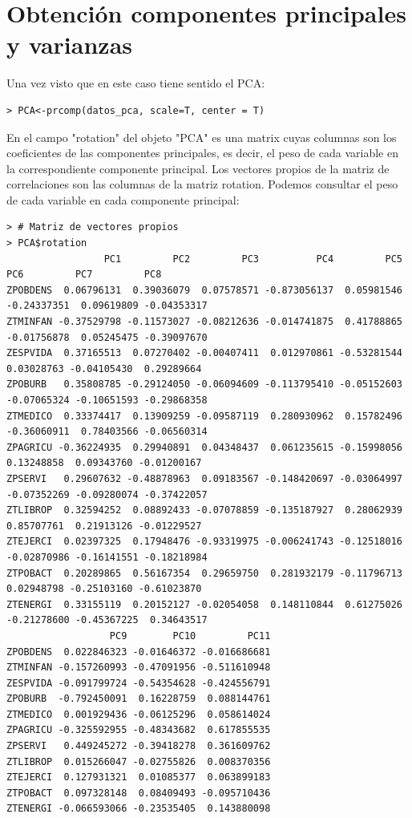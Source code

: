 \documentclass[12pt,twoside]{report}
\begin{document}
\section*{Obtención componentes principales y varianzas}

Una vez visto que en este caso tiene sentido el PCA:

\begin{lstlisting}
> PCA<-prcomp(datos_pca, scale=T, center = T)
\end{lstlisting}

En el campo "rotation" del objeto "PCA" es una matrix cuyas columnas son los coeficientes de las componentes principales, es decir, el
peso de cada variable en la correspondiente componente principal. Los vectores propios de la matriz de correlaciones son las columnas de la matriz rotation.
Podemos consultar el peso de cada variable en cada componente principal:

\scriptsize \begin{verbatim}
> # Matriz de vectores propios
> PCA$rotation
                 PC1         PC2         PC3          PC4         PC5         PC6         PC7         PC8
ZPOBDENS  0.06796131  0.39036079  0.07578571 -0.873056137  0.05981546 -0.24337351  0.09619809 -0.04353317
ZTMINFAN -0.37529798 -0.11573027 -0.08212636 -0.014741875  0.41788865 -0.01756878  0.05245475 -0.39097670
ZESPVIDA  0.37165513  0.07270402 -0.00407411  0.012970861 -0.53281544  0.03028763 -0.04105430  0.29289664
ZPOBURB   0.35808785 -0.29124050 -0.06094609 -0.113795410 -0.05152603 -0.07065324 -0.10651593 -0.29868358
ZTMEDICO  0.33374417  0.13909259 -0.09587119  0.280930962  0.15782496 -0.36060911  0.78403566 -0.06560314
ZPAGRICU -0.36224935  0.29940891  0.04348437  0.061235615 -0.15998056  0.13248858  0.09343760 -0.01200167
ZPSERVI   0.29607632 -0.48878963  0.09183567 -0.148420697 -0.03064997 -0.07352269 -0.09280074 -0.37422057
ZTLIBROP  0.32594252  0.08892433 -0.07078859 -0.135187927  0.28062939  0.85707761  0.21913126 -0.01229527
ZTEJERCI  0.02397325  0.17948476 -0.93319975 -0.006241743 -0.12518016 -0.02870986 -0.16141551 -0.18218984
ZTPOBACT  0.20289865  0.56167354  0.29659750  0.281932179 -0.11796713  0.02948798 -0.25103160 -0.61023870
ZTENERGI  0.33155119  0.20152127 -0.02054058  0.148110844  0.61275026 -0.21278600 -0.45367225  0.34643517
                  PC9        PC10         PC11
ZPOBDENS  0.022846323 -0.01646372 -0.016686681
ZTMINFAN -0.157260993 -0.47091956 -0.511610948
ZESPVIDA -0.091799724 -0.54354628 -0.424556791
ZPOBURB  -0.792450091  0.16228759  0.088144761
ZTMEDICO  0.001929436 -0.06125296  0.058614024
ZPAGRICU -0.325592955 -0.48343682  0.617855535
ZPSERVI   0.449245272 -0.39418278  0.361609762
ZTLIBROP  0.015266047 -0.02755826  0.008370356
ZTEJERCI  0.127931321  0.01085377  0.063899183
ZTPOBACT  0.097328148  0.08409493 -0.095710436
ZTENERGI -0.066593066 -0.23535405  0.143880098
\end{verbatim}
\normalsize
\end{document}
